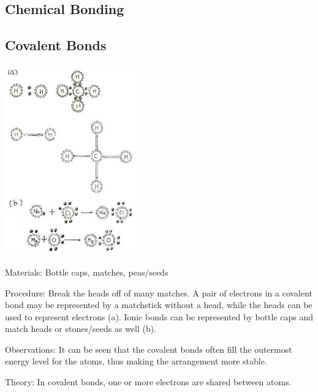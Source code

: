 \begin{multicols}{2}
\vfill
\columnbreak


\section*{Chemical Bonding} 


\subsection{Covalent Bonds}

\begin{center}
\includegraphics[width=0.43\textwidth]{./img/source/covalent-bonds.jpg}
\end{center}

\begin{description*}
\item[Materials:]{Bottle caps, matches, peas/seeds}
\item[Procedure:]{Break the heads off of many matches. A pair of electrons in a covalent bond may be
represented by a matchstick without a  head, while the heads can be used to represent electrons (a). Ionic bonds can be represented by bottle caps
and match heads or stones/seeds as well (b).}
\item[Observations:]{It can be seen that the covalent bonds often fill the outermost energy level for the atoms, thus making the arrangement more stable.}
\item[Theory:]{In covalent bonds, one or more electrons are shared between atoms.}
\end{description*}


\end{multicols}
